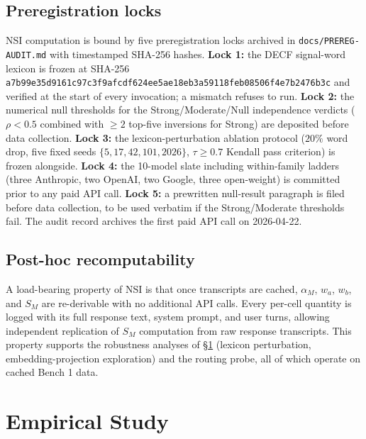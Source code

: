 \documentclass{article}
\begin{document}
\subsection{Preregistration locks}
NSI computation is bound by five preregistration locks archived in \texttt{docs/PREREG-AUDIT.md} with timestamped SHA-256 hashes. \textbf{Lock 1:} the DECF signal-word lexicon is frozen at SHA-256 \texttt{a7b99e35d9161c97c3f9afcdf624ee5ae18eb3a59118feb08506f4e7b2476b3c} and verified at the start of every invocation; a mismatch refuses to run. \textbf{Lock 2:} the numerical null thresholds for the Strong/Moderate/Null independence verdicts ($\rho < 0.5$ combined with $\geq 2$ top-five inversions for Strong) are deposited before data collection. \textbf{Lock 3:} the lexicon-perturbation ablation protocol ($20\%$ word drop, five fixed seeds $\{5, 17, 42, 101, 2026\}$, $\tau \geq 0.7$ Kendall pass criterion) is frozen alongside. \textbf{Lock 4:} the 10-model slate including within-family ladders (three Anthropic, two OpenAI, two Google, three open-weight) is committed prior to any paid API call. \textbf{Lock 5:} a prewritten null-result paragraph is filed before data collection, to be used verbatim if the Strong/Moderate thresholds fail. The audit record archives the first paid API call on 2026-04-22.

\subsection{Post-hoc recomputability}
A load-bearing property of NSI is that once transcripts are cached, $\alpha_M$, $w_a$, $w_b$, and $S_M$ are re-derivable with no additional API calls. Every per-cell quantity is logged with its full response text, system prompt, and user turns, allowing independent replication of $S_M$ computation from raw response transcripts. This property supports the robustness analyses of \S\ref{sec:empirical} (lexicon perturbation, embedding-projection exploration) and the routing probe, all of which operate on cached Bench 1 data.

\section{Empirical Study}
\label{sec:empirical}
\end{document}
